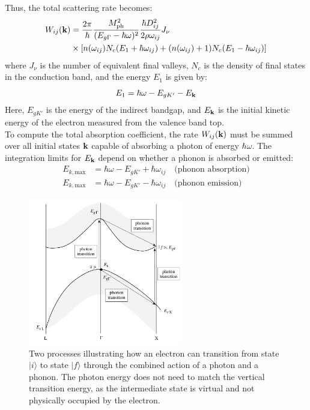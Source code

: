 Thus, the total scattering rate becomes:
\begin{equation}
	\begin{aligned}
		W_{ij}(\vb{k}) & = \frac{2\pi}{\hbar} \frac{M_{\text{ph}}^2}{(E_{g\Gamma} - \hbar \omega)^2} \frac{\hbar D_{ij}^2}{2 \rho \omega_{ij}} J_\nu \\
		               & \times \left[ n(\omega_{ij}) N_c(E_1 + \hbar \omega_{ij}) + (n(\omega_{ij}) + 1) N_c(E_1 - \hbar \omega_{ij}) \right]
	\end{aligned}
\end{equation}
where \( J_\nu \) is the number of equivalent final valleys, \( N_c \) is the density of final states in the conduction band, and the energy \( E_1 \) is given by:
\begin{equation}
	E_1 = \hbar \omega - E_{gK'} - E_{\vb{k}}
\end{equation}
Here, \( E_{gK'} \) is the energy of the indirect bandgap, and \( E_{\vb{k}} \) is the initial kinetic energy of the electron measured from the valence band top.\\
To compute the total absorption coefficient, the rate \( W_{ij}(\vb{k}) \) must be summed over all initial states \( \vb{k} \) capable of absorbing a photon of energy \( \hbar \omega \). The integration limits for \( E_{\vb{k}} \) depend on whether a phonon is absorbed or emitted:
\begin{align*}
	E_{k,\text{max}} & = \hbar \omega - E_{gK'} + \hbar \omega_{ij} \quad \text{(phonon absorption)} \\
	E_{k,\text{max}} & = \hbar \omega - E_{gK'} - \hbar \omega_{ij} \quad \text{(phonon emission)}
\end{align*}
\begin{figure}[H]
	\centering
	\includegraphics[width=0.6\textwidth]{img/phonon&photon.png}
	\caption{Two processes illustrating how an electron can transition from state $\lvert i \rangle$ to state $\lvert f \rangle$ through the combined action of a photon and a phonon. The photon energy does not need to match the vertical transition energy, as the intermediate state is virtual and not physically occupied by the electron.}
	\label{fig:indirect_transitions}
\end{figure}
